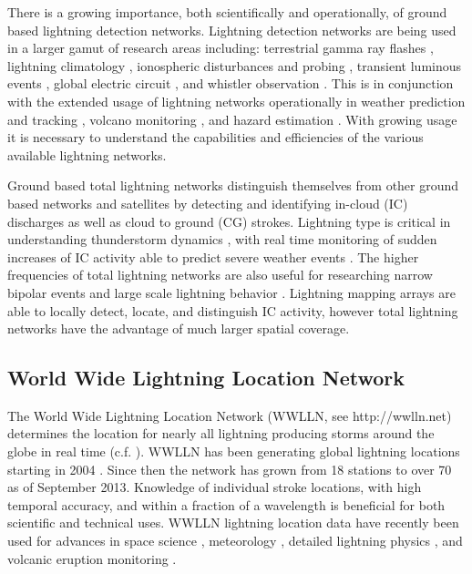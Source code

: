 There is a growing importance, both scientifically and operationally, of ground based lightning detection networks.
Lightning detection networks are being used in a larger gamut of research areas including: terrestrial gamma ray flashes \citep{Dwyer2012, Gjesteland2011, Connaughton2010}, lightning climatology \citep{Virts2013, Virts2011a, Burgesser2012}, ionospheric disturbances and probing \citep{Jacobson2010, Singh2011}, transient luminous events \citep{Soula2011}, global electric circuit  \citep{Holzworth2005}, and whistler observation \citep{Collier2010, Collier2011a, Burkholder2013}.
This is in conjunction with the extended usage of lightning networks operationally in weather prediction and tracking \citep{Fierro2012, Pan2010, Thomas2010d}, volcano monitoring \citep{Doughton2010}, and hazard estimation \citep{Altaratz2010}.
With growing usage it is necessary to understand the capabilities and efficiencies of the various available lightning networks.

Ground based total lightning networks distinguish themselves from other ground based networks and satellites by detecting and identifying in-cloud (IC) discharges as well as cloud to ground (CG) strokes.
Lightning type is critical in understanding thunderstorm dynamics \citep{Williams1989}, with real time monitoring of sudden increases of IC activity able to predict severe weather events \citep{Rudlosky2013, Darden2010, Metzger2013, Schultz2009, Schultz2011}.
The higher frequencies of total lightning networks are also useful for researching narrow bipolar events \citep{Suszcynsky2003} and large scale lightning behavior \citep{Hutchins2013}.
Lightning mapping arrays are able to locally detect, locate, and distinguish IC activity, however total lightning networks have the advantage of much larger spatial coverage.

\subsection{World Wide Lightning Location Network}


The World Wide Lightning Location Network (WWLLN, see http://wwlln.net) determines the location for nearly all lightning producing storms around the globe in real time (c.f. \citet{Jacobson2006c}).
WWLLN has been generating global lightning locations starting in 2004 \citep{Rodger2006, Rodger2009}.
Since then the network has grown from 18 stations to over 70 as of September 2013.
Knowledge of individual stroke locations, with high temporal accuracy, and within a fraction of a wavelength is beneficial for both scientific and technical uses.
WWLLN lightning location data have recently been used for advances in space science \citep{Lay2007, Kumar2009, Collier2009, Holzworth2011, Jacobson2011}, meteorology \citep{Price2009,Thomas2010d}, detailed lightning physics \citep{Connaughton2010}, and volcanic eruption monitoring \citep{Doughton2010}.

